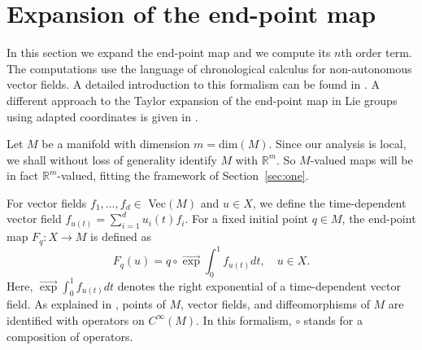 \documentclass[12pt, reqno]{amsart}
\theoremstyle{plain}
\theoremstyle{definition}
\theoremstyle{remark}
\numberwithin{equation}{section}
\newcommand{\R}{\mathbb{R}}
\newcommand{\0}{\theta}
\newcommand{\1}{{-1}}
\renewcommand{\=}{\coloneqq}
\renewcommand{\.}{\dots}
\newcommand{\eexp}{\overrightarrow{\exp}}
\begin{document}
 
 
 
 
 
 
 
 
 
 
 
 
 
 
 
 
 
 
 
 
 
 
 
 
 
 
 
 
 
 
 
 
 
 
 
 
 
 
 
 
 
 
 




\section{Expansion of the end-point map}

\label{EXPA}


\renewcommand{\odot}{\circ}


In this section we expand the end-point map and we compute  its $n$th order term. The computations use the language of chronological calculus for non-autonomous vector fields. A detailed introduction to this formalism  can be found in \cite[{\color{black} Chapter 2}]{AgrSac}. 
 {\color{black} A different approach to the Taylor expansion of the end-point  map in Lie groups   using adapted coordinates is given in
\cite{JozB21}.}




Let $M$ be a manifold with dimension $m=\mathrm{dim}(M)$. Since   our analysis is local, we shall without loss of generality identify $M$ with $\R^m$.
So $M$-valued maps will be in fact $\R^m$-valued, fitting the framework of Section~\ref{sec:one}.
 


For vector fields $f_1,\.,f_d\in$ Vec$(M)$ and $u\in X $, we define the time-dependent vector field $f_{u(t)}=\sum_{i=1}^d u_i(t)f_i$. For a fixed initial point $q\in M$, the end-point map $F_{q}:X \to M$ is defined as  
\[
 F_{q}(u) =q\odot \eexp\int_0^1f_{u(t)}dt,\quad u\in X .
\]
Here,   $\eexp\int_0^1f_{u(t)}dt$ denotes the right exponential of a time-dependent vector field. As explained in  \cite[Chapter 20]{AgrSac}, 
points of $M$, vector fields, and diffeomorphisms of $M$ are identified with operators on $C^\infty(M)$. In this formalism, 
$\odot$ stands for a composition of operators.
 
\end{document}
